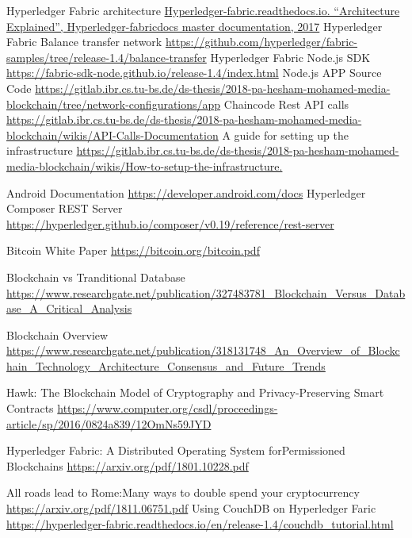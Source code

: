 \documentclass{report}
\begin{document}
\cleardoublepage








\cleardoublepage

\begin{thebibliography}{9}

Hyperledger Fabric architecture
\url{Hyperledger-fabric.readthedocs.io. “Architecture Explained”, Hyperledger-fabricdocs master documentation, 2017}
Hyperledger Fabric Balance transfer network 
\url{https://github.com/hyperledger/fabric-samples/tree/release-1.4/balance-transfer}
Hyperledger Fabric Node.js SDK
\url{https://fabric-sdk-node.github.io/release-1.4/index.html}
Node.js APP Source Code
\url{https://gitlab.ibr.cs.tu-bs.de/ds-thesis/2018-pa-hesham-mohamed-media-blockchain/tree/network-configurations/app}
Chaincode Rest API calls 
\url{https://gitlab.ibr.cs.tu-bs.de/ds-thesis/2018-pa-hesham-mohamed-media-blockchain/wikis/API-Calls-Documentation}
A guide for setting up the infrastructure
\url{https://gitlab.ibr.cs.tu-bs.de/ds-thesis/2018-pa-hesham-mohamed-media-blockchain/wikis/How-to-setup-the-infrastructure.}

Android Documentation
\url{https://developer.android.com/docs}
Hyperledger Composer REST Server
\url{https://hyperledger.github.io/composer/v0.19/reference/rest-server}

Bitcoin White Paper
\url{https://bitcoin.org/bitcoin.pdf}

Blockchain vs Tranditional Database
\url{https://www.researchgate.net/publication/327483781_Blockchain_Versus_Database_A_Critical_Analysis}

Blockchain Overview
\url{https://www.researchgate.net/publication/318131748_An_Overview_of_Blockchain_Technology_Architecture_Consensus_and_Future_Trends}

Hawk: The Blockchain Model of Cryptography and Privacy-Preserving Smart Contracts
\url{https://www.computer.org/csdl/proceedings-article/sp/2016/0824a839/12OmNs59JYD}

Hyperledger Fabric: A Distributed Operating System forPermissioned Blockchains
\url{https://arxiv.org/pdf/1801.10228.pdf}

All roads lead to Rome:Many ways to double spend your cryptocurrency
\url{https://arxiv.org/pdf/1811.06751.pdf}
Using CouchDB on Hyperledger Faric
\url{https://hyperledger-fabric.readthedocs.io/en/release-1.4/couchdb_tutorial.html}


\appendix
\end{thebibliography}
\cleardoublepage
\end{document}
